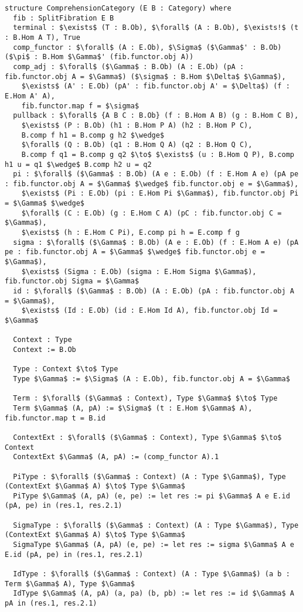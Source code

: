 \documentclass{article}
\begin{document}
\newpage
\begin{lstlisting}[mathescape=true]
structure ComprehensionCategory (E B : Category) where
  fib : SplitFibration E B
  terminal : $\exists$ (T : B.Ob), $\forall$ (A : B.Ob), $\exists!$ (t : B.Hom A T), True
  comp_functor : $\forall$ (A : E.Ob), $\Sigma$ ($\Gamma$' : B.Ob) ($\pi$ : B.Hom $\Gamma$' (fib.functor.obj A))
  comp_adj : $\forall$ ($\Gamma$ : B.Ob) (A : E.Ob) (pA : fib.functor.obj A = $\Gamma$) ($\sigma$ : B.Hom $\Delta$ $\Gamma$),
    $\exists$ (A' : E.Ob) (pA' : fib.functor.obj A' = $\Delta$) (f : E.Hom A' A),
    fib.functor.map f = $\sigma$
  pullback : $\forall$ {A B C : B.Ob} (f : B.Hom A B) (g : B.Hom C B),
    $\exists$ (P : B.Ob) (h1 : B.Hom P A) (h2 : B.Hom P C),
    B.comp f h1 = B.comp g h2 $\wedge$
    $\forall$ (Q : B.Ob) (q1 : B.Hom Q A) (q2 : B.Hom Q C),
    B.comp f q1 = B.comp g q2 $\to$ $\exists$ (u : B.Hom Q P), B.comp h1 u = q1 $\wedge$ B.comp h2 u = q2
  pi : $\forall$ ($\Gamma$ : B.Ob) (A e : E.Ob) (f : E.Hom A e) (pA pe : fib.functor.obj A = $\Gamma$ $\wedge$ fib.functor.obj e = $\Gamma$),
    $\exists$ (Pi : E.Ob) (pi : E.Hom Pi $\Gamma$), fib.functor.obj Pi = $\Gamma$ $\wedge$
    $\forall$ (C : E.Ob) (g : E.Hom C A) (pC : fib.functor.obj C = $\Gamma$),
    $\exists$ (h : E.Hom C Pi), E.comp pi h = E.comp f g
  sigma : $\forall$ ($\Gamma$ : B.Ob) (A e : E.Ob) (f : E.Hom A e) (pA pe : fib.functor.obj A = $\Gamma$ $\wedge$ fib.functor.obj e = $\Gamma$),
    $\exists$ (Sigma : E.Ob) (sigma : E.Hom Sigma $\Gamma$), fib.functor.obj Sigma = $\Gamma$
  id : $\forall$ ($\Gamma$ : B.Ob) (A : E.Ob) (pA : fib.functor.obj A = $\Gamma$),
    $\exists$ (Id : E.Ob) (id : E.Hom Id A), fib.functor.obj Id = $\Gamma$

  Context : Type
  Context := B.Ob

  Type : Context $\to$ Type
  Type $\Gamma$ := $\Sigma$ (A : E.Ob), fib.functor.obj A = $\Gamma$

  Term : $\forall$ ($\Gamma$ : Context), Type $\Gamma$ $\to$ Type
  Term $\Gamma$ (A, pA) := $\Sigma$ (t : E.Hom $\Gamma$ A), fib.functor.map t = B.id

  ContextExt : $\forall$ ($\Gamma$ : Context), Type $\Gamma$ $\to$ Context
  ContextExt $\Gamma$ (A, pA) := (comp_functor A).1

  PiType : $\forall$ ($\Gamma$ : Context) (A : Type $\Gamma$), Type (ContextExt $\Gamma$ A) $\to$ Type $\Gamma$
  PiType $\Gamma$ (A, pA) (e, pe) := let res := pi $\Gamma$ A e E.id (pA, pe) in (res.1, res.2.1)

  SigmaType : $\forall$ ($\Gamma$ : Context) (A : Type $\Gamma$), Type (ContextExt $\Gamma$ A) $\to$ Type $\Gamma$
  SigmaType $\Gamma$ (A, pA) (e, pe) := let res := sigma $\Gamma$ A e E.id (pA, pe) in (res.1, res.2.1)

  IdType : $\forall$ ($\Gamma$ : Context) (A : Type $\Gamma$) (a b : Term $\Gamma$ A), Type $\Gamma$
  IdType $\Gamma$ (A, pA) (a, pa) (b, pb) := let res := id $\Gamma$ A pA in (res.1, res.2.1)
\end{lstlisting}
\end{document}
